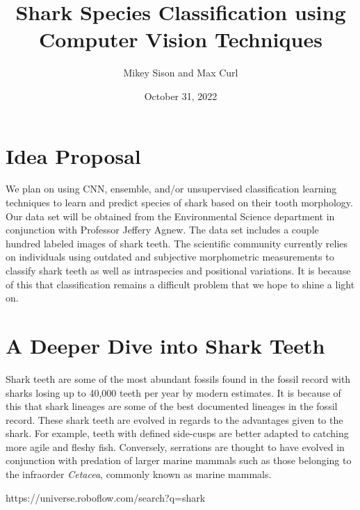 \documentclass{article}
\title{Shark Species Classification using Computer Vision Techniques}
\author{Mikey Sison and Max Curl}
\date{October 31, 2022}
\begin{document}
\maketitle

\section{Idea Proposal}
We plan on using CNN, ensemble, and/or unsupervised classification learning techniques to learn and predict species of shark based on their tooth morphology. Our data set will be obtained from the Environmental Science department in conjunction with Professor Jeffery Agnew. The data set includes a couple hundred labeled images of shark teeth. The scientific community currently relies on individuals using outdated and subjective morphometric measurements to classify shark teeth as well as intraspecies and positional variations. It is because of this that classification remains a difficult problem that we hope to shine a light on. 

\section{A Deeper Dive into Shark Teeth}
Shark teeth are some of the most abundant fossils found in the fossil record with sharks losing up to 40,000 teeth per year by modern estimates. It is because of this that shark lineages are some of the best documented lineages in the fossil record. These shark teeth are evolved in regards to the advantages given to the shark. For example, teeth with defined side-cusps are better adapted to catching more agile and fleshy fish. Conversely, serrations are thought to have evolved in conjunction with predation of larger marine mammals such as those belonging to the infraorder \textit{Cetacea}, commonly known as marine mammals.

\link https://universe.roboflow.com/search?q=shark%
\end{document}
